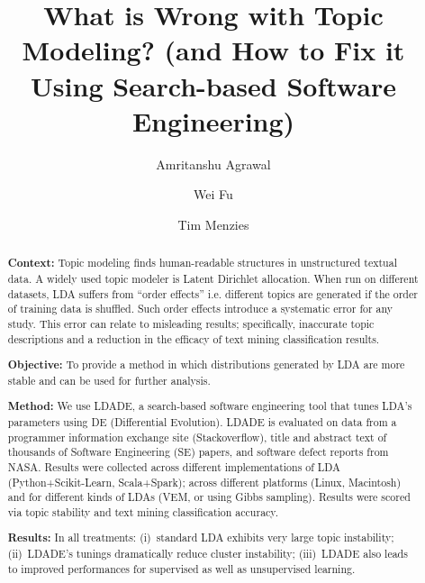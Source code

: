 \documentclass[twocolumn,5p,sort&compress]{elsarticle}
\theoremstyle{break}
\begin{document}
\begin{frontmatter}

\title{What is  Wrong with
Topic Modeling? (and How to Fix it Using Search-based Software Engineering)}



\author{Amritanshu Agrawal}



\author{Wei Fu}

\author{Tim Menzies}
\address{Department of Computer Science, North Carolina State University, Raleigh, NC, USA}

\begin{abstract}

\noindent \textbf{Context:} Topic modeling finds
  human-readable structures in unstructured textual data. A
  widely used topic modeler is Latent Dirichlet allocation. When
  run on different datasets, LDA suffers from ``order effects''
  i.e.
 different topics are generated if the order of training data is shuffled.
  Such order effects introduce a
 systematic error for any study. This error can relate to misleading results;
  specifically, inaccurate topic descriptions and a reduction in the efficacy of
  text mining classification results.

 \noindent
\textbf{Objective:} To provide a method in which distributions
generated by LDA are more stable and can be used for further analysis.

 \noindent
\textbf{Method:} We use LDADE, a search-based software engineering tool that tunes LDA's parameters using DE 
(Differential Evolution).
LDADE is evaluated on data from a programmer
information exchange site (Stackoverflow), title and abstract text of thousands
of Software Engineering (SE) papers, and software defect reports from NASA. Results were collected
across different implementations of LDA (Python+Scikit-Learn, Scala+Spark); across
different platforms (Linux, Macintosh) and for different kinds of LDAs (VEM, or using Gibbs sampling). 
Results were scored via topic stability and text mining classification accuracy.

\noindent
\textbf{Results:}
In all treatments:
   (i)~standard LDA exhibits very large topic instability;
  (ii)~LDADE's tunings dramatically reduce cluster instability; 
  (iii)~LDADE also leads to  improved performances for supervised as well as unsupervised learning.


\end{abstract}
\end{frontmatter}
\end{document}
